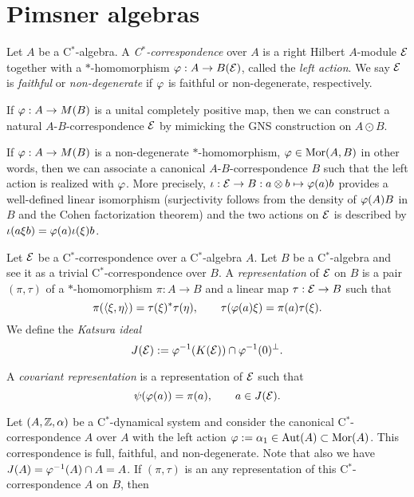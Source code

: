 \documentclass{../../large}
\begin{document}
\section{Pimsner algebras}


\begin{prb}[C$^*$-correspondences]
Let $A$ be a C$^*$-algebra.
A \emph{C$^*$-correspondence} over $A$ is a right Hilbert $A$-module $\mathcal{E}$ together with a $*$-homomorphism $\varphi:A\to B(\mathcal{E})$, called the \emph{left action}.
We say $\mathcal{E}$ is \emph{faithful} or \emph{non-degenerate} if $\varphi$ is faithful or non-degenerate, respectively.
\begin{parts}
\item If $\varphi:A\to M(B)$ is a unital completely positive map, then we can construct a natural $A$-$B$-correspondence $\mathcal{E}$ by mimicking the GNS construction on $A\odot B$.
\item If $\varphi:A\to M(B)$ is a non-degenerate $*$-homomorphism, $\varphi\in\operatorname{Mor}(A,B)$ in other words, then we can associate a canonical $A$-$B$-correspondence $B$ such that the left action is realized with $\varphi$.
More precisely, $\iota:\mathcal{E}\to B:a\otimes b\mapsto\varphi(a)b$ provides a well-defined linear isomorphism (surjectivity follows from the density of $\varphi(A)B$ in $B$ and the Cohen factorization theorem) and the two actions on $\mathcal{E}$ is described by $\iota(a\xi b)=\varphi(a)\iota(\xi)b$.
\end{parts}
\end{prb}


\begin{prb}
Let $\mathcal{E}$ be a C$^*$-correspondence over a C$^*$-algebra $A$.
Let $B$ be a C$^*$-algebra and see it as a trivial C$^*$-correspondence over $B$.
A \emph{representation} of $\mathcal{E}$ on $B$ is a pair $(\pi,\tau)$ of a $*$-homomorphism $\pi:A\to B$ and a linear map $\tau:\mathcal{E}\to B$ such that
\[\pi(\langle\xi,\eta\rangle)=\tau(\xi)^*\tau(\eta),\qquad\tau(\varphi(a)\xi)=\pi(a)\tau(\xi).\]
We define the \emph{Katsura ideal}
\[J(\mathcal{E}):=\varphi^{-1}(K(\mathcal{E}))\cap\varphi^{-1}(0)^\perp.\]

A \emph{covariant representation} is a representation of $\mathcal{E}$ such that
\[\psi(\varphi(a))=\pi(a),\qquad a\in J(\mathcal{E}).\]
\begin{parts}
\item
Let $(A,\mathbb{Z},\alpha)$ be a C$^*$-dynamical system and consider the canonical C$^*$-correspondence $A$ over $A$ with the left action $\varphi:=\alpha_1\in\operatorname{Aut}(A)\subset\operatorname{Mor}(A)$.
This correspondence is full, faithful, and non-degenerate.
Note that also we have $J(A)=\varphi^{-1}(A)\cap A=A$.
If $(\pi,\tau)$ is an any representation of this C$^*$-correspondence $A$ on $B$, then 
\end{parts}
\end{prb}
\end{document}
